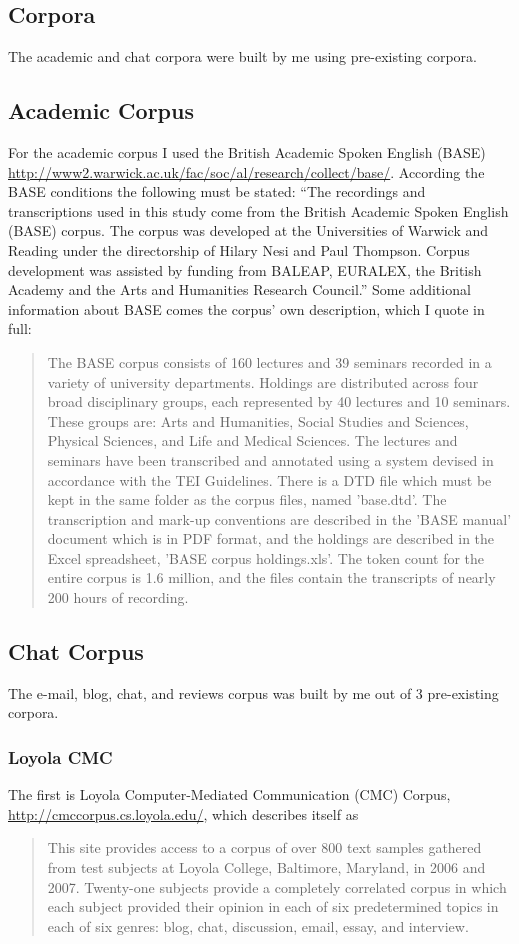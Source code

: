 \documentclass{article}
\begin{document}
\subsection{Corpora}
The academic and chat corpora were built by me using pre-existing corpora.
\subsection{Academic Corpus}\label{acadom}
For the academic corpus I used the British Academic Spoken English (BASE) \url{http://www2.warwick.ac.uk/fac/soc/al/research/collect/base/}. According the BASE conditions the following must be stated: ``The recordings and transcriptions used in this study come from the British Academic Spoken English (BASE) corpus. The corpus was developed at the Universities of Warwick and Reading under the directorship of Hilary Nesi and Paul Thompson. Corpus development was assisted by funding from BALEAP, EURALEX, the British Academy and the Arts and Humanities Research Council.'' Some additional information about BASE comes the corpus' own description, which I quote in full:
\begin{quote}
    The BASE corpus consists of 160 lectures and 39 seminars recorded in a variety of university departments. Holdings are distributed across four broad disciplinary groups, each represented by 40 lectures and 10 seminars. These groups are: Arts and Humanities, Social Studies and Sciences, Physical Sciences, and Life and Medical Sciences. The lectures and seminars have been transcribed and annotated using a system devised in accordance with the TEI Guidelines. There is a DTD file which must be kept in the same folder as the corpus files, named 'base.dtd'. The transcription and mark-up conventions are described in the 'BASE manual' document which is in PDF format, and the holdings are described in the Excel spreadsheet, 'BASE corpus holdings.xls'. The token count for the entire corpus is 1.6 million, and the files contain the transcripts of nearly 200 hours of recording.
\end{quote}

\subsection{Chat Corpus}
The e-mail, blog, chat, and reviews corpus was built by me out of 3 pre-existing corpora.
\subsubsection{Loyola CMC} 
The first is Loyola Computer-Mediated Communication (CMC) Corpus, \url{http://cmccorpus.cs.loyola.edu/}, which describes itself as
\begin{quote}
    This site provides access to a corpus of over 800 text samples gathered from test subjects at Loyola College, Baltimore, Maryland, in 2006 and 2007.  Twenty-one subjects provide a completely correlated corpus in which each subject provided their opinion in each of six predetermined topics in each of six genres: blog, chat, discussion, email, essay, and interview.
\end{quote}
\end{document}
